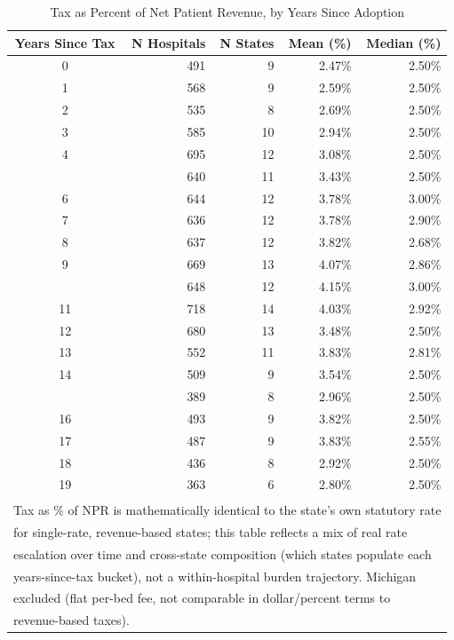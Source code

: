 \begin{table}[!h]
\centering
\caption{Tax as Percent of Net Patient Revenue, by Years Since Adoption}
\centering
\begin{tabular}[t]{crrrr}
\toprule
Years Since Tax & N Hospitals & N States & Mean (\%) & Median (\%)\\
\midrule
0 & 491 & 9 & 2.47\% & 2.50\%\\
1 & 568 & 9 & 2.59\% & 2.50\%\\
2 & 535 & 8 & 2.69\% & 2.50\%\\
3 & 585 & 10 & 2.94\% & 2.50\%\\
4 & 695 & 12 & 3.08\% & 2.50\%\\
\addlinespace
5 & 640 & 11 & 3.43\% & 2.50\%\\
6 & 644 & 12 & 3.78\% & 3.00\%\\
7 & 636 & 12 & 3.78\% & 2.90\%\\
8 & 637 & 12 & 3.82\% & 2.68\%\\
9 & 669 & 13 & 4.07\% & 2.86\%\\
\addlinespace
10 & 648 & 12 & 4.15\% & 3.00\%\\
11 & 718 & 14 & 4.03\% & 2.92\%\\
12 & 680 & 13 & 3.48\% & 2.50\%\\
13 & 552 & 11 & 3.83\% & 2.81\%\\
14 & 509 & 9 & 3.54\% & 2.50\%\\
\addlinespace
15 & 389 & 8 & 2.96\% & 2.50\%\\
16 & 493 & 9 & 3.82\% & 2.50\%\\
17 & 487 & 9 & 3.83\% & 2.55\%\\
18 & 436 & 8 & 2.92\% & 2.50\%\\
19 & 363 & 6 & 2.80\% & 2.50\%\\
\bottomrule
\multicolumn{5}{l}{\textsuperscript{} Tax as \% of NPR is mathematically identical to the state's own statutory rate}\\
\multicolumn{5}{l}{for single-rate, revenue-based states; this table reflects a mix of real rate}\\
\multicolumn{5}{l}{escalation over time and cross-state composition (which states populate each}\\
\multicolumn{5}{l}{years-since-tax bucket), not a within-hospital burden trajectory. Michigan}\\
\multicolumn{5}{l}{excluded (flat per-bed fee, not comparable in dollar/percent terms to}\\
\multicolumn{5}{l}{revenue-based taxes).}\\
\end{tabular}
\end{table}
